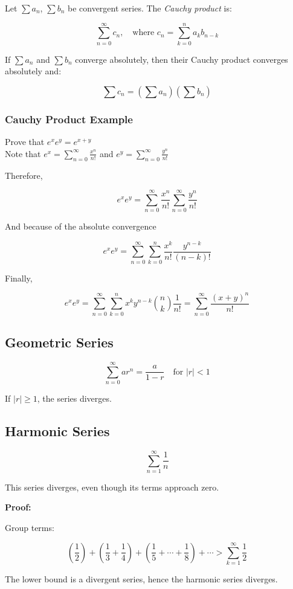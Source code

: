 Let \(\sum a_n\), \(\sum b_n\) be convergent series. The \emph{Cauchy product} is:

\[
    \sum_{n=0}^\infty c_n, \quad \text{where } c_n = \sum_{k=0}^n a_k b_{n-k}
\]

If \(\sum a_n\) and \(\sum b_n\) converge absolutely, then their Cauchy product converges absolutely and:

\[
    \sum c_n = \left( \sum a_n \right) \left( \sum b_n \right)
\]

\subsubsection{Cauchy Product Example}

Prove that \(e^x  e^y = e^{x + y}\)\\
Note that \(e^x = \sum_{n = 0}^{\infty} \frac{x^n}{n!}\) and \(e^y = \sum_{n = 0}^{\infty} \frac{y^n}{n!}\)

Therefore,

\[
    e^x e^y = \sum_{n = 0}^{\infty} \frac{x^n}{n!} \sum_{n = 0}^{\infty} \frac{y^n}{n!}
\]

And because of the absolute convergence

\[
    e^x e^y = \sum_{n = 0}^{\infty}\sum_{k = 0}^{n} \frac{x^k}{n!} \frac{y^{n - k}}{(n-k)!}
\]

Finally,

\[
    e^x e^y = \sum_{n = 0}^{\infty}\sum_{k = 0}^{n}x^k y^{n - k} \binom{n}{k} \frac{1}{n!} = \sum_{n = 0}^{\infty} \frac{{(x + y)}^n}{n!}
\]
\QED

\subsection{Geometric Series}

\[
    \sum_{n=0}^\infty ar^n = \frac{a}{1 - r} \quad \text{for } |r| < 1
\]

If \(|r| \ge 1\), the series diverges.

\subsection{Harmonic Series}

\[
    \sum_{n=1}^{\infty} \frac{1}{n}
\]

This series diverges, even though its terms approach zero.

\textbf{Proof:} 

Group terms:

\[
    \left(\frac{1}{2}\right) + \left(\frac{1}{3} + \frac{1}{4}\right) + \left(\frac{1}{5} + \cdots + \frac{1}{8}\right) + \cdots > \sum_{k=1}^\infty \frac{1}{2}
\]

The lower bound is a divergent series, hence the harmonic series diverges.
